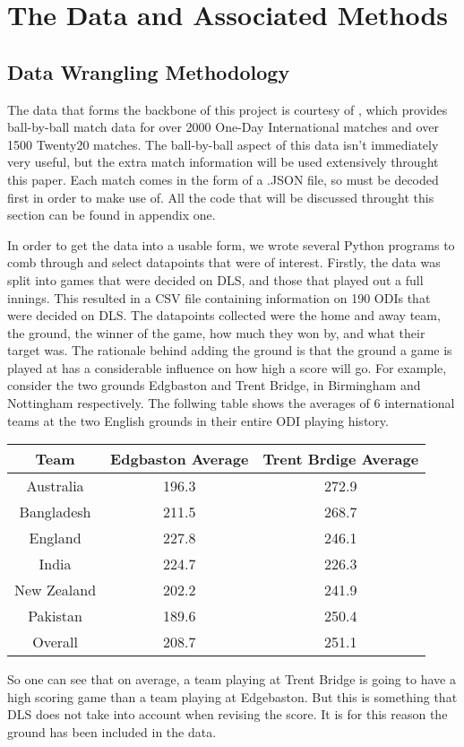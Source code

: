 \chapter{The Data and Associated Methods}

\section{Data Wrangling Methodology}
The data that forms the backbone of this project is courtesy of \cite{cricData}, which provides ball-by-ball match data for over 2000 One-Day International matches
and over 1500 Twenty20 matches. The ball-by-ball aspect of this data isn't immediately very useful, but the extra match information will be used extensively throught
this paper. Each match comes in the form of a .JSON file, so must be decoded first in order to make use of. All the code that will be discussed throught this section
can be found in appendix one. \newline



In order to get the data into a usable form, we wrote several Python programs to comb through and select datapoints that were of interest. Firstly, the data was split 
into games that were decided on DLS, and those that played out a full innings. This resulted in a CSV file containing information on 190 ODIs that were decided on DLS. 
The datapoints collected were the home and away team, the ground, the winner of the game, how much they won by, and what their target was. 
The rationale behind adding the ground is that the ground a game is played at has a considerable influence on how high a score will go. For example, 
consider the two grounds Edgbaston and Trent Bridge, in Birmingham and Nottingham respectively. The follwing table shows the averages of 6 international teams at the two 
English grounds in their entire ODI playing history.


\begin{center}
    \begin{tabular}{c|c|c}
    Team & Edgbaston Average & Trent Brdige Average \\
    \hline
    Australia & 196.3 & 272.9 \\  
    Bangladesh & 211.5 & 268.7 \\
    England & 227.8 & 246.1 \\
    India & 224.7 & 226.3 \\
    New Zealand & 202.2 & 241.9 \\
    Pakistan & 189.6 & 250.4 \\
    Overall & 208.7 & 251.1    
    \end{tabular}
\end{center}

So one can see that on average, a team playing at Trent Bridge is going to have a high scoring game than a team playing at Edgebaston. But this is something that DLS does
not take into account when revising the score. It is for this reason the ground has been included in the data.